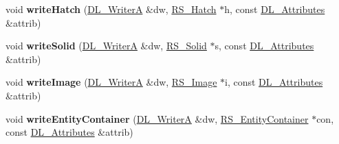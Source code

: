\begin{DoxyCompactItemize}
\item 
\hypertarget{classRS__FilterJWW_aee68fdd87cbd45046eee58992ead475b}{void {\bfseries write\-Hatch} (\hyperlink{classDL__WriterA}{D\-L\-\_\-\-Writer\-A} \&dw, \hyperlink{classRS__Hatch}{R\-S\-\_\-\-Hatch} $\ast$h, const \hyperlink{classDL__Attributes}{D\-L\-\_\-\-Attributes} \&attrib)}\label{classRS__FilterJWW_aee68fdd87cbd45046eee58992ead475b}

\item 
\hypertarget{classRS__FilterJWW_a074df919d3b8684ad6948b633d5ef0f8}{void {\bfseries write\-Solid} (\hyperlink{classDL__WriterA}{D\-L\-\_\-\-Writer\-A} \&dw, \hyperlink{classRS__Solid}{R\-S\-\_\-\-Solid} $\ast$s, const \hyperlink{classDL__Attributes}{D\-L\-\_\-\-Attributes} \&attrib)}\label{classRS__FilterJWW_a074df919d3b8684ad6948b633d5ef0f8}

\item 
\hypertarget{classRS__FilterJWW_a111f633650582ab6c8637c0df4e99a78}{void {\bfseries write\-Image} (\hyperlink{classDL__WriterA}{D\-L\-\_\-\-Writer\-A} \&dw, \hyperlink{classRS__Image}{R\-S\-\_\-\-Image} $\ast$i, const \hyperlink{classDL__Attributes}{D\-L\-\_\-\-Attributes} \&attrib)}\label{classRS__FilterJWW_a111f633650582ab6c8637c0df4e99a78}

\item 
\hypertarget{classRS__FilterJWW_a3b9667156a6856abef9293476213d3f9}{void {\bfseries write\-Entity\-Container} (\hyperlink{classDL__WriterA}{D\-L\-\_\-\-Writer\-A} \&dw, \hyperlink{classRS__EntityContainer}{R\-S\-\_\-\-Entity\-Container} $\ast$con, const \hyperlink{classDL__Attributes}{D\-L\-\_\-\-Attributes} \&attrib)}\label{classRS__FilterJWW_a3b9667156a6856abef9293476213d3f9}


\end{DoxyCompactItemize}
